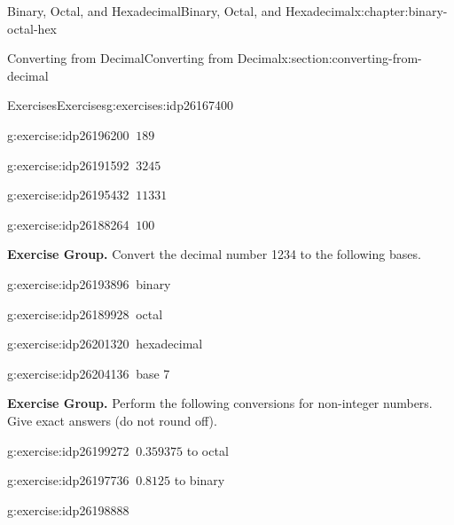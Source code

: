 \documentclass[twoside,10pt,]{book}
\numberwithin{equation}{section}
\begin{document}
\begin{chapterptx}{Binary, Octal, and Hexadecimal}{}{Binary, Octal, and Hexadecimal}{}{}{x:chapter:binary-octal-hex}
\begin{sectionptx}{Converting from Decimal}{}{Converting from Decimal}{}{}{x:section:converting-from-decimal}
\begin{exercises-subsection}{Exercises}{}{Exercises}{}{}{g:exercises:idp26167400}
\begin{exercisegroup}
\begin{divisionexerciseeg}{25}{}{}{g:exercise:idp26196200}%
\(\ 189\)\end{divisionexerciseeg}%
\begin{divisionexerciseeg}{26}{}{}{g:exercise:idp26191592}%
\(\ 3245\)\end{divisionexerciseeg}%
\begin{divisionexerciseeg}{27}{}{}{g:exercise:idp26195432}%
\(\ 11331\)\end{divisionexerciseeg}%
\begin{divisionexerciseeg}{28}{}{}{g:exercise:idp26188264}%
\(\ 100\)\end{divisionexerciseeg}%
\end{exercisegroup}
\par\medskip\noindent
\par\medskip\noindent%
\textbf{Exercise Group.}\space\space%
Convert the decimal number 1234 to the following bases.\begin{exercisegroup}
\begin{divisionexerciseeg}{29}{}{}{g:exercise:idp26193896}%
\(\ \)binary\end{divisionexerciseeg}%
\begin{divisionexerciseeg}{30}{}{}{g:exercise:idp26189928}%
\(\ \)octal\end{divisionexerciseeg}%
\begin{divisionexerciseeg}{31}{}{}{g:exercise:idp26201320}%
\(\ \)hexadecimal\end{divisionexerciseeg}%
\begin{divisionexerciseeg}{32}{}{}{g:exercise:idp26204136}%
\(\ \)base 7\end{divisionexerciseeg}%
\end{exercisegroup}
\par\medskip\noindent
\par\medskip\noindent%
\textbf{Exercise Group.}\space\space%
Perform the following conversions for non-integer numbers.  Give exact answers (do not round off).\begin{exercisegroup}
\begin{divisionexerciseeg}{33}{}{}{g:exercise:idp26199272}%
\(\ 0.359375\) to octal\end{divisionexerciseeg}%
\begin{divisionexerciseeg}{34}{}{}{g:exercise:idp26197736}%
\(\ 0.8125\) to binary\end{divisionexerciseeg}%
\begin{divisionexerciseeg}{35}{}{}{g:exercise:idp26198888}%

\end{divisionexerciseeg}
\end{exercisegroup}
\end{exercises-subsection}
\end{sectionptx}
\end{chapterptx}
\end{document}

